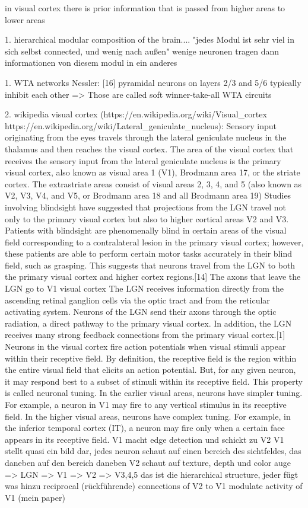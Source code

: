 in visual cortex there is prior information that is passed from higher areas to lower areas

1. hierarchical modular composition of the brain.... \citep{hierarchicalBrain} "jedes Modul ist sehr viel in sich selbst connected, und wenig nach außen" wenige neuronen tragen dann informationen von diesem modul in ein anderes

1. WTA networks
Nessler: [16] pyramidal neurons on layers 2/3 and 5/6 typically inhibit each other => Those are called soft winner-take-all WTA circuits

2. wikipedia visual cortex (https://en.wikipedia.org/wiki/Visual_cortex
https://en.wikipedia.org/wiki/Lateral_geniculate_nucleus):
 Sensory input originating from the eyes travels through the lateral geniculate nucleus in the thalamus and then reaches the visual cortex. The area of the visual cortex that receives the sensory input from the lateral geniculate nucleus is the primary visual cortex, also known as visual area 1 (V1), Brodmann area 17, or the striate cortex. The extrastriate areas consist of visual areas 2, 3, 4, and 5 (also known as V2, V3, V4, and V5, or Brodmann area 18 and all Brodmann area 19)
 Studies involving blindsight have suggested that projections from the LGN travel not only to the primary visual cortex but also to higher cortical areas V2 and V3. Patients with blindsight are phenomenally blind in certain areas of the visual field corresponding to a contralateral lesion in the primary visual cortex; however, these patients are able to perform certain motor tasks accurately in their blind field, such as grasping. This suggests that neurons travel from the LGN to both the primary visual cortex and higher cortex regions.[14]
The axons that leave the LGN go to V1 visual cortex
The LGN receives information directly from the ascending retinal ganglion cells via the optic tract and from the reticular activating system. Neurons of the LGN send their axons through the optic radiation, a direct pathway to the primary visual cortex. In addition, the LGN receives many strong feedback connections from the primary visual cortex.[1]
 Neurons in the visual cortex fire action potentials when visual stimuli appear within their receptive field.
By definition, the receptive field is the region within the entire visual field that elicits an action potential. But, for any given neuron, it may respond best to a subset of stimuli within its receptive field. This property is called neuronal tuning. In the earlier visual areas, neurons have simpler tuning. For example, a neuron in V1 may fire to any vertical stimulus in its receptive field. In the higher visual areas, neurons have complex tuning. For example, in the inferior temporal cortex (IT), a neuron may fire only when a certain face appears in its receptive field.
V1 macht edge detection und schickt zu V2
V1 stellt quasi ein bild dar, jedes neuron schaut auf einen bereich des sichtfeldes, das daneben auf den bereich daneben
V2 schaut auf texture, depth und color
auge => LGN => V1 => V2 => V3,4,5
das ist die hierarchical structure, jeder fügt was hinzu
 reciprocal (rückführende) connections of V2 to V1 modulate activity of V1 (mein paper)




